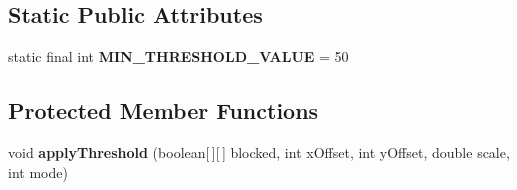 \subsection*{Static Public Attributes}
\begin{DoxyCompactItemize}
\item 
\hypertarget{classdev_1_1boxy_1_1fortyfive_1_1core_1_1image_1_1_image_grid_a2c3f40e0bdeab7621066a3ed7890938f}{
static final int {\bfseries MIN\_\-THRESHOLD\_\-VALUE} = 50}
\label{d1/d3a/classdev_1_1boxy_1_1fortyfive_1_1core_1_1image_1_1_image_grid_a2c3f40e0bdeab7621066a3ed7890938f}

\end{DoxyCompactItemize}
\subsection*{Protected Member Functions}
\begin{DoxyCompactItemize}
\item 
\hypertarget{classdev_1_1boxy_1_1fortyfive_1_1core_1_1image_1_1_image_grid_a4558120fb1536f6598276a9bb40d70c3}{
void {\bfseries applyThreshold} (boolean\mbox{[}$\,$\mbox{]}\mbox{[}$\,$\mbox{]} blocked, int xOffset, int yOffset, double scale, int mode)}
\label{d1/d3a/classdev_1_1boxy_1_1fortyfive_1_1core_1_1image_1_1_image_grid_a4558120fb1536f6598276a9bb40d70c3}

\end{DoxyCompactItemize}
